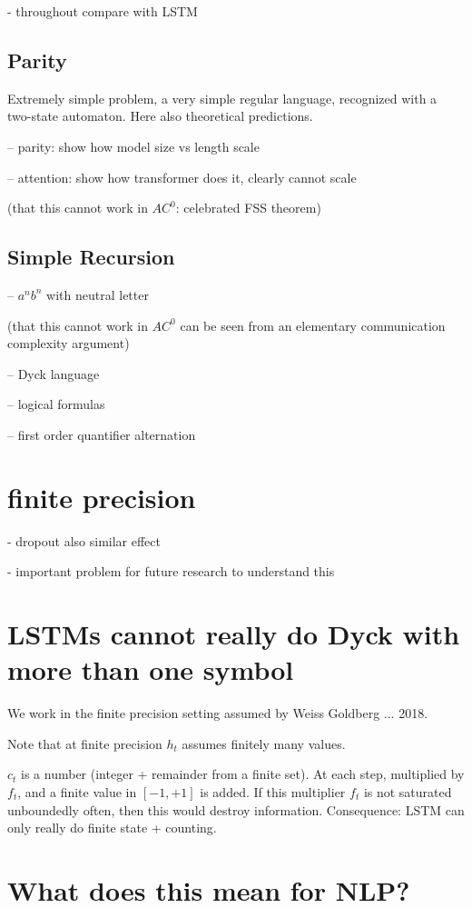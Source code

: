 \documentclass[11pt,a4paper]{article}
\newcounter{theorem}
\begin{document}
- throughout compare with LSTM

\subsection{Parity}
Extremely simple problem, a very simple regular language, recognized with a two-state automaton.
Here also theoretical predictions.

-- parity: show how model size vs length scale

-- attention: show how transformer does it, clearly cannot scale

(that this cannot work in $AC^0$: celebrated FSS theorem)

\subsection{Simple Recursion}
-- $a^nb^n$ with neutral letter

(that this cannot work in $AC^0$ can be seen from an elementary communication complexity argument)

-- Dyck language

-- logical formulas

-- first order quantifier alternation

\section{finite precision}

- dropout also similar effect

- important problem for future research to understand this


\section{LSTMs cannot really do Dyck with more than one symbol}

We work in the finite precision setting assumed by Weiss Goldberg ... 2018.

Note that at finite precision $h_t$ assumes finitely many values.

$c_t$ is a number (integer + remainder from a finite set). At each step, multiplied by $f_t$, and a finite value in $[-1,+1]$ is added.
If this multiplier $f_t$ is not saturated unboundedly often, then this would destroy information.
Consequence: LSTM can only really do finite state + counting.


\section{What does this mean for NLP?}
\end{document}
